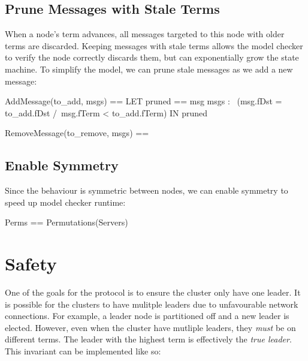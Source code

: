 \subsection{Prune Messages with Stale Terms}

When a node's term advances, all messages targeted to this node with older terms
are discarded. Keeping messages with stale terms allows the model checker to 
verify the node correctly discards them, but can exponentially grow the state
machine. To simplify the model, we can prune stale messages as we add a new 
message: \newline

\begin{tla}
AddMessage(to_add, msgs) == 
    LET 
        pruned == {msg \in msgs : 
                    ~(msg.fDst = to_add.fDst /\ msg.fTerm < to_add.fTerm)}
    IN
        pruned 

RemoveMessage(to_remove, msgs) ==
\end{tla}
\begin{tlatex}
%
%
%
%
%
\@pvspace{8.0pt}%
%
\end{tlatex}

\subsection{Enable Symmetry}

Since the behaviour is symmetric between nodes, we can enable symmetry to speed
up model checker runtime:\newline

\begin{tla}
Perms == Permutations(Servers)
\end{tla}
\begin{tlatex}
%
\end{tlatex}

\section{Safety}

One of the goals for the protocol is to ensure the cluster only have one leader.
It is possible for the clusters to have mulitple leaders due to unfavourable
network connections. For example, a leader node is partitioned off and a new
leader is elected. However, even when the cluster have mutliple leaders, they
\textit{must} be on different terms. The leader with the highest term is
effectively the \textit{true leader}. This invariant can be implemented like
so:\newline

